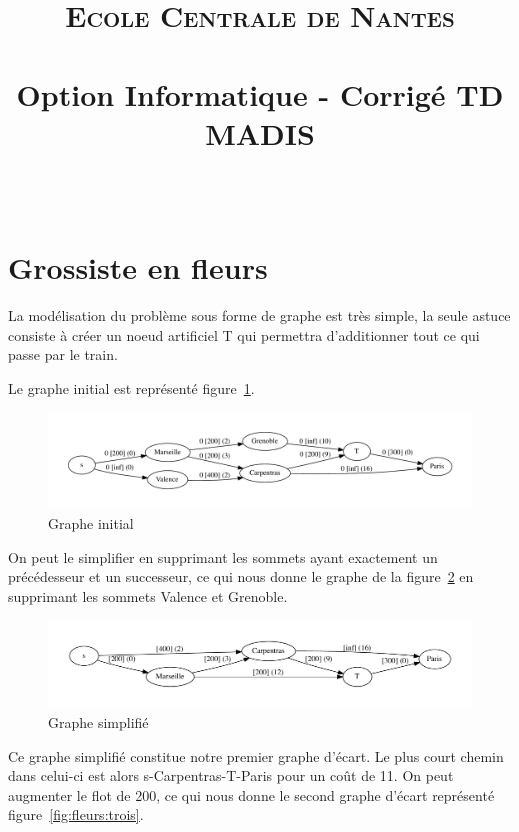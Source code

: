 \documentclass[paper=a4, fontsize=11pt]{scrartcl} %
\title{	
\normalfont \normalsize 
\textsc{Ecole Centrale de Nantes} \\ [25pt] %
\horrule{0.5pt} \\[0.4cm] %
\huge Option Informatique - Corrigé TD MADIS \\ %
\horrule{2pt} \\[0.5cm] %
}
\numberwithin{equation}{section} %
\numberwithin{figure}{section} %
\numberwithin{table}{section} %
\begin{document}
\maketitle %

\section{Grossiste en fleurs}

La modélisation du problème sous forme de graphe est très simple, la seule astuce consiste à créer un noeud artificiel T qui permettra d'additionner tout ce qui passe par le train.

Le graphe initial est représenté figure~\ref{fig:fleurs:un}.

\begin{figure}[ht]
\begin{center}
	\includegraphics[width=\textwidth]{fleurs-1.pdf}
	\caption{Graphe initial}
	\label{fig:fleurs:un}
\end{center}
\end{figure}

On peut le simplifier en supprimant les sommets ayant exactement un précédesseur et un successeur, ce qui nous donne le graphe de la figure~\ref{fig:fleurs:deux} en supprimant les sommets Valence et Grenoble.


\begin{figure}[ht]
\begin{center}
	\includegraphics[width=\textwidth]{fleurs-2.pdf}
	\caption{Graphe simplifié}
	\label{fig:fleurs:deux}
\end{center}
\end{figure}

Ce graphe simplifié constitue notre premier graphe d'écart. Le plus court chemin dans celui-ci est alors s-Carpentras-T-Paris pour un coût de 11. On peut augmenter le flot de 200, ce qui nous donne le second graphe d'écart représenté figure~\ref{fig:fleurs:trois}.
\end{document}
